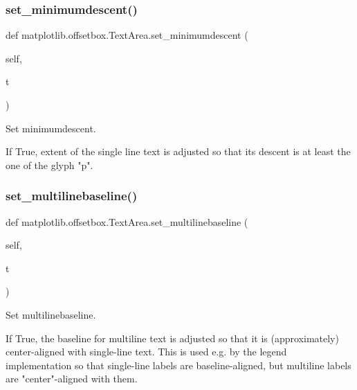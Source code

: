 \subsubsection{\texorpdfstring{set\+\_\+minimumdescent()}{set\_minimumdescent()}}
{\footnotesize\ttfamily def matplotlib.\+offsetbox.\+Text\+Area.\+set\+\_\+minimumdescent (\begin{DoxyParamCaption}\item[{}]{self,  }\item[{}]{t }\end{DoxyParamCaption})}

\begin{DoxyVerb}Set minimumdescent.

If True, extent of the single line text is adjusted so that
its descent is at least the one of the glyph "p".
\end{DoxyVerb}
 \mbox{\label{classmatplotlib_1_1offsetbox_1_1TextArea_a84eec6c537cb96e1ef48e4ec5c2a2011}} 
\subsubsection{\texorpdfstring{set\+\_\+multilinebaseline()}{set\_multilinebaseline()}}
{\footnotesize\ttfamily def matplotlib.\+offsetbox.\+Text\+Area.\+set\+\_\+multilinebaseline (\begin{DoxyParamCaption}\item[{}]{self,  }\item[{}]{t }\end{DoxyParamCaption})}

\begin{DoxyVerb}Set multilinebaseline.

If True, the baseline for multiline text is adjusted so that it is
(approximately) center-aligned with single-line text.  This is used
e.g. by the legend implementation so that single-line labels are
baseline-aligned, but multiline labels are "center"-aligned with them.
\end{DoxyVerb}
 \mbox{\label{classmatplotlib_1_1offsetbox_1_1TextArea_a73902ef7200697a0d3b71030bf153f9f}} 
